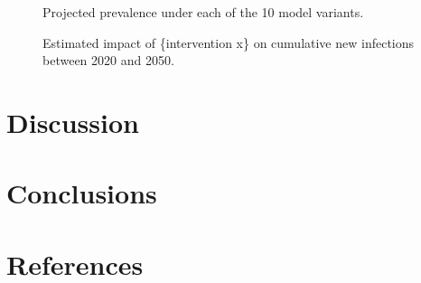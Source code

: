 \documentclass{article}
\numberwithin{equation}{section}
\begin{document}
\begin{figure}
  \centering\scalebox{6}{$\times$}
  \caption{Projected prevalence under each of the 10 model variants.}
\end{figure}
\begin{figure}
  \centering\scalebox{6}{$\times$}
  \caption{Estimated impact of \{intervention x\} on cumulative new infections between 2020 and 2050.}
\end{figure}
\section{Discussion}\label{s:discussion}
\section{Conclusions}\label{s:conclusion}
\section{References}\label{s:references}
\printbibliography[heading=none]
\end{document}
